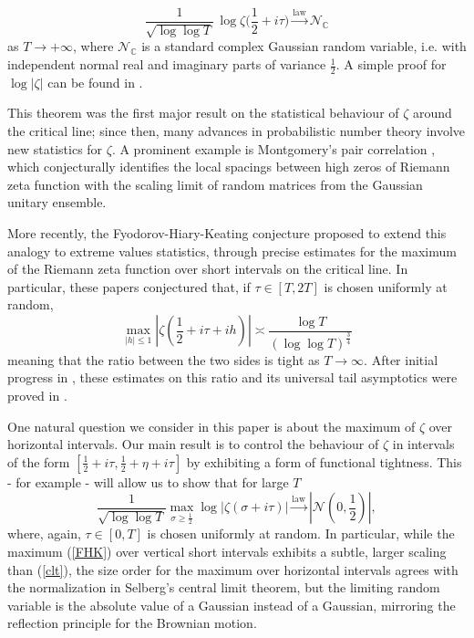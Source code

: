 \documentclass{article}
\newcommand{\1}{\mathds{1}}
\numberwithin{equation}{section}
\renewcommand{\leq}{\leqslant}
\renewcommand{\geq}{\geqslant}
\theoremstyle{plain} %
\newcommand{\hf}{\frac{1}{2}}
\begin{document}
\begin{equation}
    \label{clt}
    \dfrac{1}{\sqrt{\log \log T}}\, \log \zeta\big(\hf + i \tau\big) \overset{\text{law}}{\longrightarrow} \mathscr{N}_{\mathbb{C}}
\end{equation}
as $T \rightarrow + \infty$,  where $\mathscr{N}_{\mathbb{C}}$ is a standard complex Gaussian random variable, i.e.   with independent normal real and imaginary parts of variance $\tfrac{1}{2}$.  A simple proof for $\log |\zeta|$ can be found in \cite{RadSou2017}. 

This theorem was the first major result on the statistical behaviour of $\zeta$ around the critical line; since then,  many advances in probabilistic number theory involve new statistics for $\zeta$.  A prominent example is Montgomery's pair correlation \cite{pair}, which conjecturally identifies the local spacings between high zeros of Riemann zeta function with the scaling limit of random matrices from  the Gaussian unitary ensemble.

More recently,  the  Fyodorov-Hiary-Keating conjecture \cite{FyoHiaKea2012,fyodorov2014freezing} proposed to extend this analogy to extreme values statistics,  through precise estimates for the maximum of the Riemann zeta function over short intervals on the critical line.  In particular,  these papers conjectured that,  if $\tau \in [T, 2T]$ is chosen uniformly at random, 
\begin{equation}\label{FHK}
    \max_{|h| \leq 1} |\zeta(\hf + i \tau + i h)| \asymp \frac{\log T}{(\log \log T)^{\frac{3}{4}}}
\end{equation}
meaning that the ratio between the two sides is tight as $T \to \infty$.
  After initial progress in \cite{Naj16,ArgBelBouRadSou2016,Har2019},  these estimates on this ratio and its universal tail asymptotics were proved in 
\cite{arguin2020fyodorov1,arguin2020fyodorov2}. 

One natural question we consider in this paper is about the maximum of $\zeta$ over horizontal intervals. Our main result is to control the behaviour of $\zeta$ in intervals of the form $[\hf+ i \tau, \hf + \eta + i \tau]$ by exhibiting a form of functional tightness. This - for example - will allow us to show that for large $T$
\begin{equation}\label{eqn:maxPr}
    \frac{1}{\sqrt{\log \log T}}\max_{\sigma \geq \tfrac{1}{2}} \log|\zeta( \sigma + i \tau)|\overset{\text{law}}{\longrightarrow} |\mathscr{N}(0,\hf)|,
\end{equation}
where, again, $\tau \in [0,T]$ is chosen uniformly at random.  In particular, while the maximum (\ref{FHK}) over vertical short intervals exhibits a subtle, larger scaling than (\ref{clt}),
the  size order for the maximum over horizontal intervals agrees with the normalization in Selberg's central limit theorem, but the limiting random variable is the absolute value of a Gaussian instead of a Gaussian,
mirroring the reflection principle for the Brownian motion.
\end{document}

